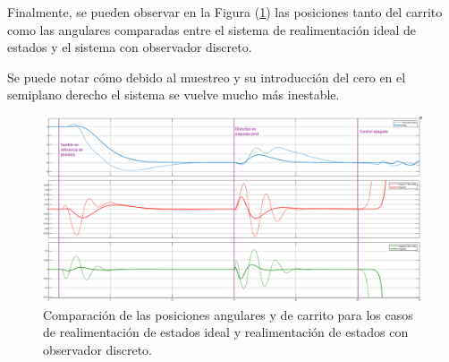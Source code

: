 Finalmente, se pueden observar en la Figura (\ref{fig:disc_vs_ideal_vars}) las posiciones tanto del carrito como las angulares comparadas entre el sistema de realimentación ideal de estados y el sistema con observador discreto. 

Se puede notar cómo debido al muestreo y su introducción del cero en el semiplano derecho el sistema se vuelve mucho más inestable.

\begin{figure}[H]
	\centering
	\includegraphics[width=\linewidth]{../Analisis de Resultados/ImagenesAnalisis de Resultados/disc_vs_ideal_vars.png}
	\caption{Comparación de las posiciones angulares y de carrito para los casos de realimentación de estados ideal y realimentación de estados con observador discreto.}	
	\label{fig:disc_vs_ideal_vars}
\end{figure}

